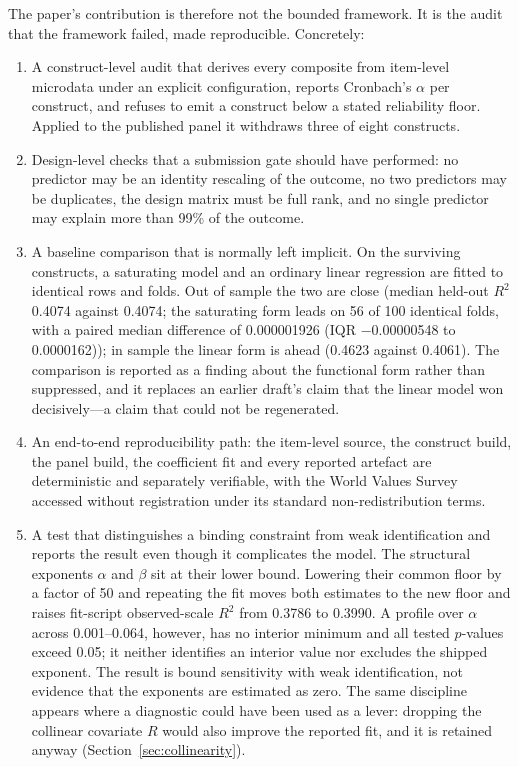 \documentclass[11pt]{article}
\begin{document}
The paper's contribution is therefore not the bounded framework. It is the audit that the framework failed, made reproducible. Concretely:

\begin{enumerate}
\item A construct-level audit that derives every composite from item-level microdata under an explicit configuration, reports Cronbach's $\alpha$ per construct, and refuses to emit a construct below a stated reliability floor. Applied to the published panel it withdraws three of eight constructs.
\item Design-level checks that a submission gate should have performed: no predictor may be an identity rescaling of the outcome, no two predictors may be duplicates, the design matrix must be full rank, and no single predictor may explain more than 99\% of the outcome.
\item A baseline comparison that is normally left implicit. On the surviving constructs, a saturating model and an ordinary linear regression are fitted to identical rows and folds. Out of sample the two are close (median held-out $R^2$ \num{0.4074} against \num{0.4074}; the saturating form leads on 56 of 100 identical folds, with a paired median difference of \num{0.000001926} (IQR \num{-0.00000548} to \num{0.0000162})); in sample the linear form is ahead (\num{0.4623} against \num{0.4061}). The comparison is reported as a finding about the functional form rather than suppressed, and it replaces an earlier draft's claim that the linear model won decisively---a claim that could not be regenerated.
\item An end-to-end reproducibility path: the item-level source, the construct build, the panel build, the coefficient fit and every reported artefact are deterministic and separately verifiable, with the World Values Survey accessed without registration under its standard non-redistribution terms.
\item A test that distinguishes a binding constraint from weak identification and reports the result even though it complicates the model. The structural exponents $\alpha$ and $\beta$ sit at their lower bound. Lowering their common floor by a factor of \num{50} and repeating the fit moves both estimates to the new floor and raises fit-script observed-scale $R^2$ from \num{0.3786} to \num{0.3990}. A profile over $\alpha$ across \num{0.001}--\num{0.064}, however, has no interior minimum and all tested $p$-values exceed \num{0.05}; it neither identifies an interior value nor excludes the shipped exponent. The result is bound sensitivity with weak identification, not evidence that the exponents are estimated as zero. The same discipline appears where a diagnostic could have been used as a lever: dropping the collinear covariate $R$ would also improve the reported fit, and it is retained anyway (Section~\ref{sec:collinearity}).

\end{enumerate}
\end{document}
